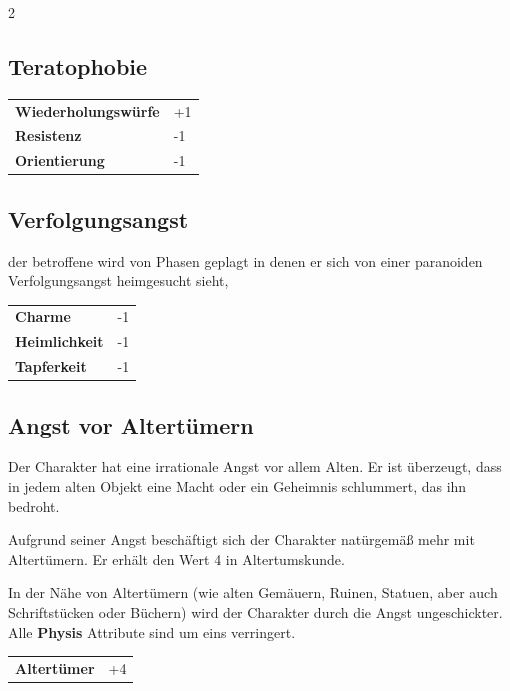 \begin{multicols}{2}
    \subsection*{Teratophobie}




    \begin{tabular}{@{}ll@{}}
        \textbf{Wiederholungswürfe} & +1\\
        \textbf{Resistenz} & -1\\
        \textbf{Orientierung} & -1\\
    \end{tabular}

    \subsection*{Verfolgungsangst}

    der betroffene wird von Phasen geplagt in denen er sich von einer paranoiden Verfolgungsangst heimgesucht sieht,



    \begin{tabular}{@{}ll@{}}
        \textbf{Charme} & -1\\
        \textbf{Heimlichkeit} & -1\\
        \textbf{Tapferkeit} & -1\\
    \end{tabular}

    \subsection*{Angst vor Altertümern}

    Der Charakter hat eine irrationale Angst vor allem Alten. Er ist überzeugt, dass in jedem alten Objekt eine Macht oder ein Geheimnis schlummert, das ihn bedroht.

    Aufgrund seiner Angst beschäftigt sich der Charakter natürgemäß mehr mit Altertümern. Er erhält den Wert 4 in Altertumskunde.

    In der Nähe von Altertümern (wie alten Gemäuern, Ruinen, Statuen, aber auch Schriftstücken oder Büchern) wird der Charakter durch die Angst ungeschickter. Alle \textbf{Physis} Attribute sind um eins verringert.

    \begin{tabular}{@{}ll@{}}
        \textbf{Altertümer} & +4\\
    \end{tabular}


\end{multicols}
